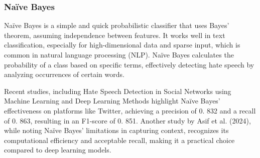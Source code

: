 \subsubsection{Na\"ive Bayes}

\noindent
Naïve Bayes is a simple and quick probabilistic classifier that uses Bayes' theorem, assuming independence between features. It works well in text classification, especially for high-dimensional data and sparse input, which is common in natural language processing (NLP). Naïve Bayes calculates the probability of a class based on specific terms, effectively detecting hate speech by analyzing occurrences of certain words.

Recent studies, including Hate Speech Detection in Social Networks using Machine Learning and Deep Learning Methods \citep{hate2022bonetti} highlight Naïve Bayes' effectiveness on platforms like Twitter, achieving a precision of 0. 832 and a recall of 0. 863, resulting in an F1-score of 0. 851. Another study by Asif et al. (2024), while noting Naïve Bayes' limitations in capturing context, recognizes its computational efficiency and acceptable recall, making it a practical choice compared to deep learning models.